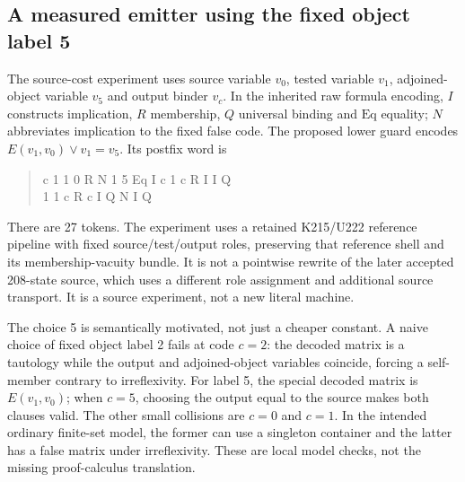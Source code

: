 \subsection{A measured emitter using the fixed object label 5}
The source-cost experiment uses source variable $v_0$, tested variable $v_1$,
adjoined-object variable $v_5$ and output binder $v_c$. In the inherited raw
formula encoding, $I$ constructs implication, $R$ membership, $Q$ universal
binding and $\mathrm{Eq}$ equality; $N$ abbreviates implication to the fixed
false code. The proposed lower guard encodes
$E(v_1,v_0)\lor v_1=v_5$. Its postfix word is
\begin{quote}\ttfamily\small
c 1 1 0 R N 1 5 Eq I c 1 c R I I Q\\
1 1 c R c I Q N I Q
\end{quote}
There are 27 tokens. The experiment uses a retained K215/U222 reference pipeline with fixed
source/test/output roles, preserving that reference shell and its
membership-vacuity bundle. It is not a pointwise rewrite of the later accepted
208-state source, which uses a different role assignment and additional
source transport.
It is a source experiment, not a new literal machine.

The choice 5 is semantically motivated, not just a cheaper constant. A naive
choice of fixed object label 2 fails at code $c=2$: the decoded matrix is a
tautology while the output and adjoined-object variables coincide, forcing a
self-member contrary to irreflexivity. For label 5, the special decoded matrix
is $E(v_1,v_0)$; when $c=5$, choosing the output equal to the source makes both
clauses valid. The other small collisions are $c=0$ and $c=1$. In the intended
ordinary finite-set model, the former can use a singleton container and the
latter has a false matrix under irreflexivity. These are local model checks,
not the missing proof-calculus translation.


